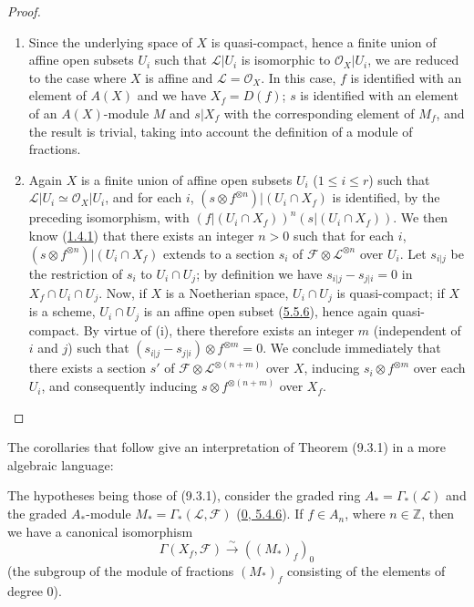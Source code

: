 \begin{proof}
\begin{enumerate}
\item[(i)] Since the underlying space of $X$ is quasi-compact, hence a
finite union of affine open subsets $U_i$ such that $\mathscr{L}|U_i$ is
isomorphic to $\mathscr{O}_X|U_i$, we are reduced to the case where $X$ is
affine and $\mathscr{L}=\mathscr{O}_X$. In this case, $f$ is identified
with an element of $A(X)$ and we have $X_f=D(f)$; $s$ is identified with an
element of an $A(X)$-module $M$ and $s|X_f$ with the corresponding element
of $M_f$, and the result is trivial, taking into account the definition of
a module of fractions.

\item[(ii)] Again $X$ is a finite union of affine open subsets $U_i$
($1\leq i\leq r$) such that $\mathscr{L}|U_i\simeq\mathscr{O}_X|U_i$, and for
each $i$,
$(s\otimes f^{\otimes n})|(U_i\cap X_f)$ is identified, by the preceding
isomorphism, with
$(f|(U_i\cap X_f))^n(s|(U_i\cap X_f))$. We then know
(\hyperref[I.1.4.1]{1.4.1}) that there exists an integer $n>0$ such that
for each $i$, $(s\otimes f^{\otimes n})|(U_i\cap X_f)$ extends to a
section $s_i$ of $\mathscr{F}\otimes\mathscr{L}^{\otimes n}$ over
$U_i$. Let $s_{i|j}$ be the restriction of $s_i$ to $U_i\cap U_j$; by
definition we have $s_{i|j}-s_{j|i}=0$ in $X_f\cap U_i\cap U_j$. Now, if
$X$ is a Noetherian space, $U_i\cap U_j$ is quasi-compact; if $X$ is a
scheme, $U_i\cap U_j$ is an affine open subset
(\hyperref[I.5.5.6]{5.5.6}), hence again quasi-compact. By virtue of
(i), there therefore exists an integer $m$ (independent of $i$ and $j$)
such that $(s_{i|j}-s_{j|i})\otimes f^{\otimes m}=0$. We conclude
immediately that there exists a section $s'$ of
$\mathscr{F}\otimes\mathscr{L}^{\otimes(n+m)}$ over $X$, inducing
$s_i\otimes f^{\otimes m}$ over each $U_i$, and consequently inducing
$s\otimes f^{\otimes(n+m)}$ over $X_f$.
\end{enumerate}
\end{proof}

The corollaries that follow give an interpretation of Theorem (9.3.1) in a
more algebraic language:

\begin{corollary}[9.3.2]
\label{I.9.3.2}
The hypotheses being those of (9.3.1), consider the graded ring
$A_* = \Gamma_*(\mathscr{L})$ and the graded $A_*$-module
$M_* = \Gamma_*(\mathscr{L},\mathscr{F})$
(\hyperref[0.5.4.6]{0, 5.4.6}). If $f\in A_n$, where $n\in\mathbb{Z}$,
then we have a canonical isomorphism
\[
  \Gamma(X_f,\mathscr{F})\xrightarrow{\sim}((M_*)_f)_0
\]
(the subgroup of the module of fractions $(M_*)_f$ consisting of the
elements of degree $0$).
\end{corollary}

